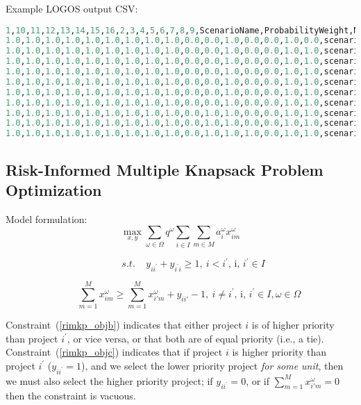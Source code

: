 Example LOGOS output CSV:
\begin{lstlisting}[basicstyle=\tiny,language=python]
1,10,11,12,13,14,15,16,2,3,4,5,6,7,8,9,ScenarioName,ProbabilityWeight,MaxNPV
1.0,1.0,1.0,1.0,1.0,1.0,1.0,1.0,1.0,0.0,0.0,1.0,0.0,0.0,1.0,0.0,scenario_1,0.012,-23.581
1.0,1.0,1.0,1.0,1.0,1.0,1.0,1.0,1.0,0.0,0.0,1.0,0.0,0.0,1.0,1.0,scenario_2,0.019,-23.459
1.0,1.0,1.0,1.0,1.0,1.0,1.0,1.0,1.0,0.0,0.0,1.0,0.0,0.0,1.0,1.0,scenario_3,0.032,-23.459
1.0,1.0,1.0,1.0,1.0,1.0,1.0,1.0,1.0,0.0,0.0,1.0,0.0,0.0,1.0,1.0,scenario_4,0.052,-23.459
1.0,1.0,1.0,1.0,1.0,1.0,1.0,1.0,1.0,0.0,0.0,1.0,0.0,0.0,1.0,1.0,scenario_5,0.086,-23.459
1.0,1.0,1.0,1.0,1.0,1.0,1.0,1.0,1.0,0.0,0.0,1.0,0.0,0.0,1.0,1.0,scenario_6,0.142,-23.459
1.0,1.0,1.0,1.0,1.0,1.0,1.0,1.0,1.0,0.0,0.0,1.0,0.0,0.0,1.0,1.0,scenario_7,0.235,-23.459
1.0,1.0,1.0,1.0,1.0,1.0,1.0,1.0,1.0,0.0,1.0,1.0,0.0,0.0,1.0,1.0,scenario_8,0.188,37.130
1.0,1.0,1.0,1.0,1.0,1.0,1.0,1.0,1.0,0.0,1.0,1.0,0.0,0.0,1.0,1.0,scenario_9,0.141,37.1230
1.0,1.0,1.0,1.0,1.0,1.0,1.0,1.0,1.0,0.0,1.0,1.0,1.0,0.0,1.0,1.0,scenario_10,0.093,42.303
\end{lstlisting}

\subsection{Risk-Informed Multiple Knapsack Problem Optimization}
\label{subsec:RImkp}

Model formulation:\\

\begin{equation}\label{rimkp_obja}
\mathop{\max}_{x,y} \sum _{ \omega  \in  \Omega }q^{ \omega } \sum _{i \in I} \sum _{m \in M}a_{i}^{ \omega }x_{im}^{ \omega }
\end{equation}

\begin{equation}\label{rimkp_objb}
~~~~~~~~~~~~s.t.~~~~~y_{ii^{'}}+y_{i^{'}i} \geq 1,~ i<i^{'}\text{, i, }i^{'} \in I
\end{equation}

\begin{equation}\label{rimkp_objc}
~~~~~~~~\sum_{m=1}^{M} x_{im}^\omega \geq \sum_{m=1}^{M} x_{i'm}^\omega + y_{ii'} -1,~ i \neq i^{'}\text{, i, }i^{'} \in I,  \omega  \in  \Omega
\end{equation}

Constraint~(\ref{rimkp_objb}) indicates that either project $i$  is of higher priority
than project  $i^{'}$, or vice versa, or that both are of equal priority (i.e., a tie).
Constraint~(\ref{rimkp_objc}) indicates that if project  $i$  is higher priority than
project  $i^{'}$ ($y_{ii^{'}}=1$), and we select the lower priority project
\textit{for some unit}, then we must also select the higher priority project;
if  $y_{ii^{'}}=0$, or if $\sum_{m=1}^{M} x_{i'm}^\omega=0$  then the constraint is vacuous.\par

